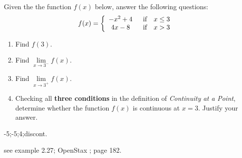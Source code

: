 \newpage
\begin{example}
Given the the function $f(x)$ below, answer the following questions:
\begin{align*}
f(x) = \left\{ \begin{array}{cc} 
                -x^2+4 & \hspace{2mm} \textrm{if} \quad x\le 3 \\
                4x-8 & \hspace{2mm} \textrm{if} \quad x > 3 \\
                \end{array} \right.
\end{align*}

\begin{enumerate}[leftmargin=*]
    \item Find $f(3)$.
    \vspace{0.5cm}
    \item Find $\lim\limits_{x \to 3^-} f(x)$.
    \vspace{0.5cm}
    \item Find $\lim\limits_{x \to 3^+} f(x)$.
    \vspace{0.5cm}
    \item Checking all \textbf{three conditions} in the definition of \emph{Continuity at a Point}, determine whether the function $f(x)$ is continuous at $x=3$. Justify your answer.
    \vspace{2.5cm}
\end{enumerate}
    \begin{sol}
    -5;-5;4;discont.
    \end{sol}
    \begin{solL}
    see example 2.27; OpenStax ; page 182.
    
    \end{solL}
\end{example}

